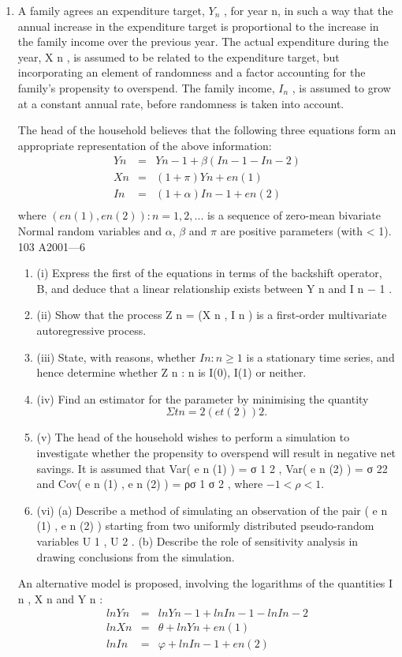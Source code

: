 \documentclass[a4paper,12pt]{article}
\begin{document}
\begin{enumerate}
\item A family agrees an expenditure target, $Y_n$ , for year n, in such a way that the annual increase in the expenditure target is proportional to the increase in the
family income over the previous year. The actual expenditure during the year, X n , is assumed to be related to the expenditure target, but incorporating an element of randomness and a factor accounting for the family’s propensity to
overspend. The family income, $I_n$ , is assumed to grow at a constant annual rate,
before randomness is taken into account.

The head of the household believes that the following three equations form an
appropriate representation of the above information:
\begin{eqnarray*}
Y n &=& Y n − 1 + \beta(I n − 1 − I n − 2 )\\
X n &=& (1 + \pi) Y n + e n (1)\\
I n &=& (1 + \alpha) I n − 1 + e n (2)\\
\end{eqnarray*}
where ${( e n (1) , e n (2) ) : n = 1, 2, ...}$ is a sequence of zero-mean bivariate Normal random variables and $\alpha$, $\beta$ and $\pi$ are positive parameters (with \beta < 1).
103 A2001—6
\begin{enumerate}
\item (i) Express the first of the equations in terms of the backshift operator, B, and deduce that a linear relationship exists between Y n and I n − 1 .
\item (ii) Show that the process Z n = (X n , I n ) is a first-order multivariate autoregressive process.
\item (iii) State, with reasons, whether ${I n : n \geq 1}$ is a stationary time series, and hence determine whether {Z n : n } is I(0), I(1) or neither.
\item (iv) Find an estimator for the parameter \alpha by minimising the quantity
\[Σ t n = 2 ( e t (2) ) 2 .\]
\item (v)
The head of the household wishes to perform a simulation to investigate whether the propensity to overspend will result in negative net savings.
It is assumed that Var( e n (1) ) = σ 1 2 , Var( e n (2) ) = σ 22 and Cov( e n (1) , e n (2) ) = ρσ 1 σ 2 , where $−1 < ρ < 1$.
\item (vi)
(a) Describe a method of simulating an observation of the pair
( e n (1) , e n (2) ) starting from two uniformly distributed pseudo-random variables U 1 , U 2 .
(b) Describe the role of sensitivity analysis in drawing conclusions from the simulation.
\end{enumerate}
An alternative model is proposed, involving the logarithms of the
quantities I n , X n and Y n :
\begin{eqnarray*}
ln Y n &=& ln Y n−1 + ln I n−1 − ln I n−2\\
ln X n &=& θ + ln Y n + e n (1)\\
ln I n &=& φ + ln I n−1 + e n (2)\\
\end{eqnarray*}


\end{enumerate}
\end{document}
